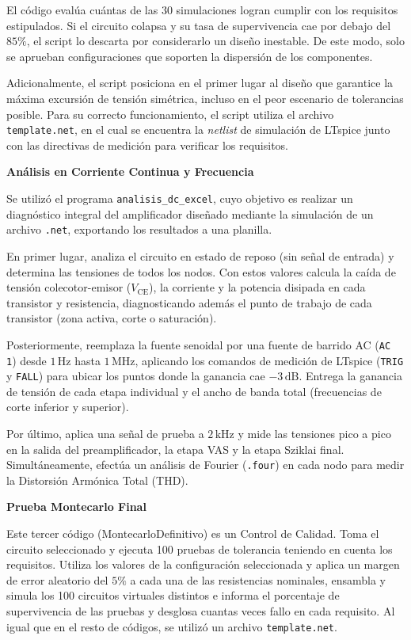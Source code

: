 El código evalúa cuántas de las 30 simulaciones logran cumplir con los requisitos estipulados. Si el circuito colapsa y su tasa de supervivencia cae por debajo del $85\%$, el script lo descarta por considerarlo un diseño inestable. De este modo, solo se aprueban configuraciones que soporten la dispersión de los componentes.

Adicionalmente, el script posiciona en el primer lugar al diseño que garantice la máxima excursión de tensión simétrica, incluso en el peor escenario de tolerancias posible. Para su correcto funcionamiento, el script utiliza el archivo \texttt{template.net}, en el cual se encuentra la \textit{netlist} de simulación de LTspice junto con las directivas de medición para verificar los requisitos.

\vspace{0.5em}
{\small\textbf{Análisis en Corriente Continua y Frecuencia}}

Se utilizó el programa \texttt{analisis\_dc\_excel}, cuyo objetivo es realizar un diagnóstico integral del amplificador diseñado mediante la simulación de un archivo \texttt{.net}, exportando los resultados a una planilla.

En primer lugar, analiza el circuito en estado de reposo (sin señal de entrada) y determina las tensiones de todos los nodos. Con estos valores calcula la caída de tensión colecotor-emisor ($V_{\text{CE}}$), la corriente y la potencia disipada en cada transistor y resistencia, diagnosticando además el punto de trabajo de cada transistor (zona activa, corte o saturación).

Posteriormente, reemplaza la fuente senoidal por una fuente de barrido AC (\texttt{AC 1}) desde $1\,\text{Hz}$ hasta $1\,\text{MHz}$, aplicando los comandos de medición de LTspice (\texttt{TRIG} y \texttt{FALL}) para ubicar los puntos donde la ganancia cae $-3\,\text{dB}$. Entrega la ganancia de tensión de cada etapa individual y el ancho de banda total (frecuencias de corte inferior y superior).

Por último, aplica una señal de prueba a $2\,\text{kHz}$ y mide las tensiones pico a pico en la salida del preamplificador, la etapa VAS y la etapa Sziklai final. Simultáneamente, efectúa un análisis de Fourier (\texttt{.four}) en cada nodo para medir la Distorsión Armónica Total (THD).

\vspace{0.5em}
{\small\textbf{Prueba Montecarlo Final}}

Este tercer código (MontecarloDefinitivo) es un Control de Calidad. Toma el circuito seleccionado y ejecuta 100 pruebas de tolerancia teniendo en cuenta los requisitos. Utiliza los valores de la configuración seleccionada y aplica un margen de error aleatorio del $5\%$ a cada una de las resistencias nominales, ensambla y simula los 100 circuitos virtuales distintos e informa el porcentaje de supervivencia de las pruebas y desglosa cuantas veces fallo en cada requisito. Al igual que en el resto de códigos, se utilizó un archivo \texttt{template.net}.

